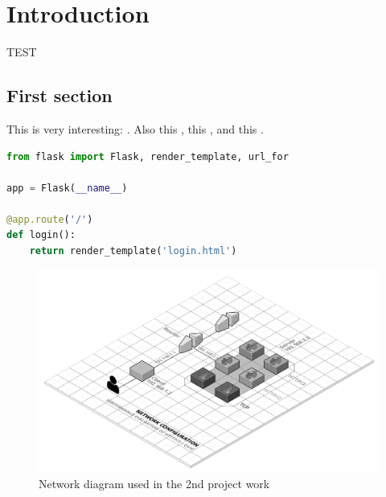 \chapter{Introduction}

TEST

\section{First section}

This is very interesting: \cite{coulouris}. Also this \cite{donoho}, this \cite{ictbusiness}, and this \cite{dalal}.

\begin{code}[Implementation]
    \begin{lstlisting}[language=Python]
from flask import Flask, render_template, url_for

app = Flask(__name__)

@app.route('/')
def login():
    return render_template('login.html')
    \end{lstlisting}
\end{code}

\begin{figure}
    \centering
    \includegraphics[scale=0.25]{imgs/DNCS-2.png}
    \caption{Network diagram used in the 2nd project work}
\end{figure}